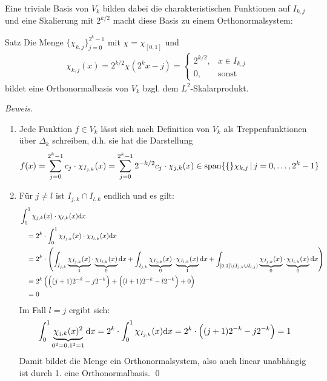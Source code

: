 Eine triviale Basis von $V_k$ bilden dabei die charakteristischen Funktionen auf $I_{k,j}$ und eine Skalierung 
mit $2^{k/2}$ macht diese Basis zu einem Orthonormalsystem:

\begin{colbox}{Satz}\label{satz:chiOrthonorm}
  Die Menge $\{\chi_{k,j}\}_{j=0}^{2^k-1}$ mit $\chi = \chi_{[0,1]}$ und
  \begin{align*}
    \chi_{k,j}(x) = 2^{k/2}\chi(2^kx-j) = \begin{cases}
      2^{k/2}, &x\in I_{k,j}\\
      0, &\text{sonst}
    \end{cases} 
  \end{align*}
  bildet eine Orthonormalbasis von $V_k$ bzgl. dem $L^2$-Skalarprodukt.
\end{colbox}
\textit{Beweis.}
\begin{enumerate}
  \item Jede Funktion $f\in V_k$ lässt sich nach Definition von $V_k$ als Treppenfunktionen über $\Delta_k$ schreiben, 
  d.h. sie hat die Darstellung 
  \begin{align*}
    f(x) 
    = \sum_{j=0}^{2^k-1} c_j\cdot \chi_{I_{j,k}}(x)
    = \sum_{j=0}^{2^k-1} 2^{-k/2}c_j\cdot \chi_{j,k}(x) \in 
    \text{span}\{\{\}\chi_{k,j} \,|\, j=0,\dots,2^k-1\}
  \end{align*}
  \item Für $j\neq l$ ist $I_{j,k}\cap I_{l,k}$ endlich und es gilt:
  \begin{align*}
    &\int_{0}^{1} \chi_{j,k}(x) \cdot \chi_{l,k}(x) \text{d} x \\
    &\quad = 2^{k}\cdot \int_{0}^{1} \chi_{I_{j,k}}(x) \cdot \chi_{I_{l,k}}(x) \text{d} x \\
    &\quad = 2^{k}\cdot\left(
      \int_{I_{j,k}} \underbrace{\chi_{I_{j,k}}(x)}_{1} \cdot \underbrace{\chi_{I_{l,k}}(x)}_{0} \text{d} x
      + \int_{I_{j,k}} \underbrace{\chi_{I_{j,k}}(x)}_{0} \cdot \underbrace{\chi_{I_{l,k}}(x)}_{1} \text{d} x
      + \int_{[0,1]\backslash(I_{j,k}\cup I_{l,j})} 
      \underbrace{\chi_{I_{j,k}}(x)}_{0} \cdot \underbrace{\chi_{I_{l,k}}(x)}_{0}  \text{d} x
    \right) \\
    &\quad = 2^{k} \left(\Big((j+1)2^{-k} - j2^{-k}\Big) + \Big((l+1)2^{-k} - l2^{-k}\Big) + 0\right) \\
    &\quad = 0
  \end{align*}
  Im Fall $l=j$ ergibt sich:
  \begin{align*}
    \int_{0}^{1} \underbrace{\chi_{j,k}(x)^2}_{0^2=0, 1^2=1} \text{d} x 
    = 2^k \cdot \int_{0}^{1} \chi_{I_{j,k}}(x) \text{d} x 
    = 2^k \cdot \Big((j+1)2^{-k} - j2^{-k}\Big) 
    = 1
  \end{align*}
  Damit bildet die Menge ein Orthonormalsystem, also auch linear unabhängig ist durch 1. eine Orthonormalbasis.
  \qed
\end{enumerate}

